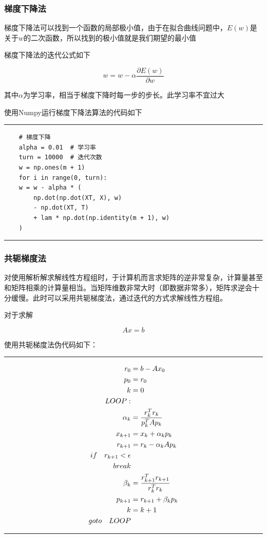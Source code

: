 \subsubsection{梯度下降法}

梯度下降法可以找到一个函数的局部极小值，由于在拟合曲线问题中，$E(w)$是关于$w$的二次函数，所以找到的极小值就是我们期望的最小值

梯度下降法的迭代公式如下

\begin{equation}
    w = w - \alpha \frac{\partial E(w)}{\partial w}
\end{equation}

其中$\alpha$为学习率，相当于梯度下降时每一步的步长。此学习率不宜过大

使用Numpy运行梯度下降法算法的代码如下

\rule{\textwidth}{0.01em}
\begin{verbatim}
    # 梯度下降
    alpha = 0.01  # 学习率
    turn = 10000  # 迭代次数
    w = np.ones(m + 1)
    for i in range(0, turn):
    w = w - alpha * (
        np.dot(np.dot(XT, X), w)
        - np.dot(XT, T)
        + lam * np.dot(np.identity(m + 1), w)
    )
\end{verbatim}
\rule{\textwidth}{0.01em}

\subsubsection{共轭梯度法}

对使用解析解求解线性方程组时，于计算机而言求矩阵的逆非常复杂，计算量甚至和矩阵相乘的计算量相当\cite{ref1}。当矩阵维数非常大时（即数据非常多），矩阵求逆会十分缓慢。此时可以采用共轭梯度法，通过迭代的方式求解线性方程组。

对于求解

\begin{equation}
    A x = b
\end{equation}

使用共轭梯度法伪代码如下\cite{ref2}：

\rule{\textwidth}{0.01em}
\begin{align}
    \notag
    r_0 &=  b - A x_0 \\
    \notag
    p_0 &=  r_0 \\
    \notag
    k   &=  0 \\
    \notag
    LOOP: \\
    \notag
    \alpha_k    &=  \frac{r_k^T r_k}{p_k^T A p_k} \\
    \notag
    x_{k + 1}   &=  x_k + \alpha_k p_k \\
    \notag
    r_{k + 1}   &=  r_k - \alpha_k A p_k \\
    \notag
    if \quad r_{k + 1} < \epsilon \\
    \notag
    break \\
    \notag
    \beta_k     &=  \frac{r_{k + 1}^T r_{k + 1}}{r_k^T r_k} \\
    \notag
    p_{k + 1}   &=  r_{k + 1} + \beta_k p_k \\
    \notag
    k           &=  k + 1 \\
    \notag
    goto \quad LOOP
\end{align}
\rule{\textwidth}{0.01em}

